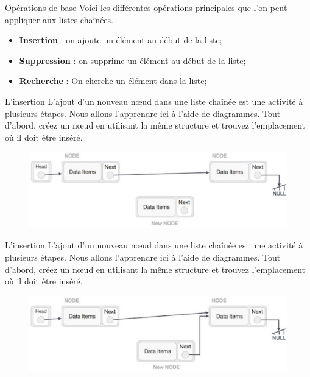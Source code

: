 \documentclass[10pt,xcolor=dvipsnames]{beamer}
\begin{document}
\begin{frame}{Opérations de base}
    Voici les différentes opérations principales que l'on peut appliquer aux listes chaînées.
    \begin{itemize}
        \item \alert{\textbf{Insertion}} : on ajoute un élément au début de la liste;
        \item \alert{\textbf{Suppression}} : on supprime un élément au début de la liste;
        \item \alert{\textbf{Recherche}} : On cherche un élément dans la liste;
    \end{itemize}
    
\end{frame}

\begin{frame}{L'insertion}
    L'ajout d'un nouveau nœud dans une liste chaînée est une activité à plusieurs étapes. Nous allons l'apprendre ici à l'aide de diagrammes. Tout d'abord, créez un nœud en utilisant la même structure et trouvez l'emplacement où il doit être inséré.
    
    \begin{figure}
        \centering
        \includegraphics[scale=0.25]{figures/CM2/list-diag-1.png}
        \label{fig:my_label}
    \end{figure}
\end{frame}
\begin{frame}{L'insertion}
    L'ajout d'un nouveau nœud dans une liste chaînée est une activité à plusieurs étapes. Nous allons l'apprendre ici à l'aide de diagrammes. Tout d'abord, créez un nœud en utilisant la même structure et trouvez l'emplacement où il doit être inséré.
    
    \begin{figure}
        \centering
        \includegraphics[scale=0.25]{figures/CM2/list-diag-2.png}
        \label{fig:my_label}
    \end{figure}
\end{frame}
\end{document}
